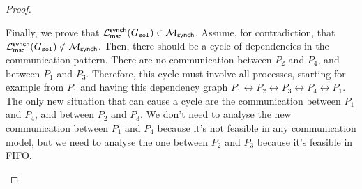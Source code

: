 \begin{proof}
\begin{itemize}
		      Finally, we prove that 
			  $\mathcal{L}_{\mathsf{msc}}^{\mathsf{synch}}(G_{\texttt{sol}}) \in \mathcal{M}_{\mathsf{synch}}$.
		      Assume, for contradiction, that 
			  $\mathcal{L}_{\mathsf{msc}}^{\mathsf{synch}}(G_{\texttt{sol}}) \notin \mathcal{M}_{\mathsf{synch}}$.
		      Then, there should be a cycle of dependencies in the communication pattern.
		      There are no communication between $P_2$ and $P_4$, and between $P_1$
		      and $P_3$. Therefore, this cycle must involve all processes, starting
		      for example from $P_1$ and having this dependency graph
		      $P_1\leftrightarrow P_2\leftrightarrow P_3\leftrightarrow P_4\leftrightarrow P_1$.
		      The only new situation that can cause a cycle are the communication
		      between $P_1$ and $P_4$, and between $P_2$ and $P_3$.
		      We don't need to analyse the new communication between $P_1$ and $P_4$ because
		      it's not feasible in any communication model, but we need to analyse the one
		      between $P_2$ and $P_3$ because it's feasible in FIFO.





		      \begin{figure}[!ht]
			      \centering
			      \begin{msc}[draw frame=none, draw head=none, msc keyword=, head height=0px, label distance=0.5ex, foot height=0px, foot distance=0px]{}


\end{msc}
\end{figure}
\end{itemize}
\end{proof}
